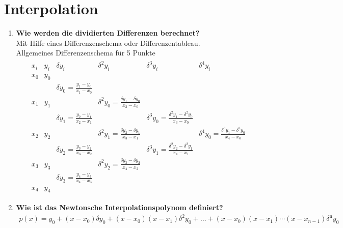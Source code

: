 \section{Interpolation}
	\begin{enumerate}
		\item \textbf{Wie werden die dividierten Differenzen berechnet?} \\
			Mit Hilfe eines Differenzenschema oder Differenzentableau. \\
			Allgemeines Differenzenschema für 5 Punkte
				\begin{align*}
				\begin{array}{cc|cccc}
					x_i & y_i &              \delta y_i              &                     \delta^2 y_i                     &                       \delta^3 y_i                       &                       \delta^4 y_i                       \\ \hline
					x_0 & y_0 &  \\
					    &     & \delta y_0 = \frac{y_1-y_0}{x_1-x_0} &  \\
					x_1 & y_1 &                                      & \delta^2 y_0 = \frac{\delta y_1-\delta y_0}{x_2-x_0} &  \\
					    &     & \delta y_1 = \frac{y_2-y_1}{x_2-x_1} &                                                      & \delta^3 y_0 = \frac{\delta^2 y_1-\delta^2 y_0}{x_3-x_0} &  \\
					x_2 & y_2 &                                      & \delta^2 y_1 = \frac{\delta y_2-\delta y_1}{x_3-x_1} &                                                          & \delta^4 y_0 = \frac{\delta^3 y_1-\delta^2 y_0}{x_4-x_0} \\
					    &     & \delta y_2 = \frac{y_3-y_2}{x_3-x_2} &                                                      & \delta^3 y_1 = \frac{\delta^2 y_2-\delta^2 y_1}{x_4-x_1} &  \\
					x_3 & y_3 &                                      & \delta^2 y_2 = \frac{\delta y_3-\delta y_2}{x_4-x_2} &  \\
					    &     & \delta y_3 = \frac{y_4-y_3}{x_4-x_3} &  \\
					x_4 & y_4 &
				\end{array}
			\end{align*}
		\item \textbf{Wie ist das Newtonsche Interpolationspolynom definiert?}
			\begin{align*}
				p(x)=y_0+(x-x_0)\delta y_0+(x-x_0)(x-x_1)\delta^2 y_0+\dots+(x-x_0)(x-x_1)\cdots(x-x_{n-1}) \delta^\text{n} y_0
			\end{align*}
		

\end{enumerate}

